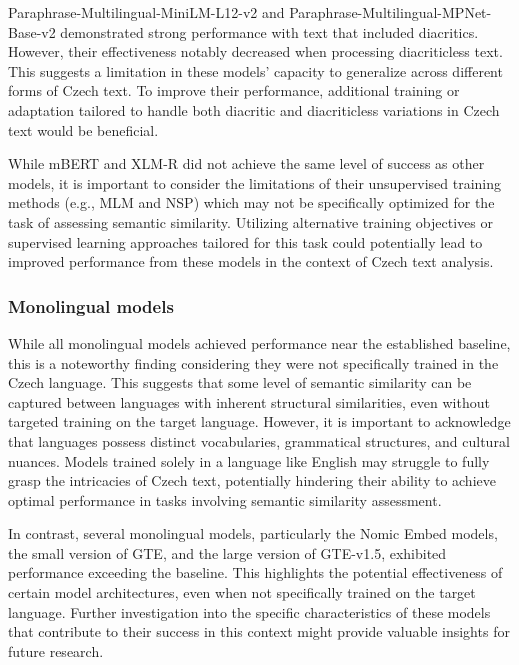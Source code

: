 Paraphrase-Multilingual-MiniLM-L12-v2 and Paraphrase-Multilingual-MPNet-Base-v2 demonstrated strong performance with text that included diacritics.
However, their effectiveness notably decreased when processing diacriticless text.
This suggests a limitation in these models' capacity to generalize across different forms of Czech text.
To improve their performance, additional training or adaptation tailored to handle both diacritic and diacriticless variations in Czech text would be beneficial.

While \ac{mBERT} and \ac{XLM-R} did not achieve the same level of success as other models, it is important to consider the limitations of their unsupervised training methods (e.g., \ac{MLM} and \ac{NSP}) which may not be specifically optimized for the task of assessing semantic similarity.
Utilizing alternative training objectives or supervised learning approaches tailored for this task could potentially lead to improved performance from these models in the context of Czech text analysis.

\subsubsection{Monolingual models}

While all monolingual models achieved performance near the established baseline, this is a noteworthy finding considering they were not specifically trained in the Czech language.
This suggests that some level of semantic similarity can be captured between languages with inherent structural similarities, even without targeted training on the target language.
However, it is important to acknowledge that languages possess distinct vocabularies, grammatical structures, and cultural nuances.
Models trained solely in a language like English may struggle to fully grasp the intricacies of Czech text, potentially hindering their ability to achieve optimal performance in tasks involving semantic similarity assessment.

In contrast, several monolingual models, particularly the Nomic Embed models, the small version of \ac{GTE}, and the large version of \ac{GTE}-v1.5, exhibited performance exceeding the baseline.
This highlights the potential effectiveness of certain model architectures, even when not specifically trained on the target language.
Further investigation into the specific characteristics of these models that contribute to their success in this context might provide valuable insights for future research.

